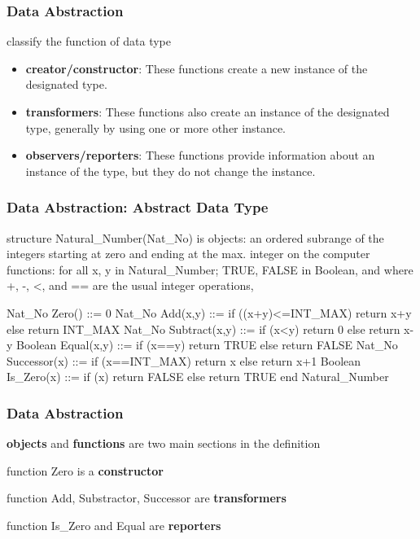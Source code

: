 \documentclass[newPxFont,sthlmFooter,nooffset]{beamer}
\begin{document}
\begin{frame}[t]
	\frametitle{Data Abstraction}
	classify the function of data type 
	\begin{itemize}
		\item\textbf{creator/constructor}: These functions create a new instance of the designated type.
		\item\textbf{transformers}: These functions also create an instance of the designated type, generally by using one or more other instance.
		\item\textbf{observers/reporters}: These functions provide information about an instance of the type, but they do not change the instance.
	\end{itemize}
	
\end{frame}

\begin{frame}[t, fragile]
  \frametitle{Data Abstraction: Abstract Data Type}
\begin{codedefnb}
structure Natural_Number(Nat_No) is
   objects: an ordered subrange of the integers 
            starting at zero and ending at the max. 
            integer on the computer 
   functions: for all x, y in Natural_Number; 
            TRUE, FALSE in Boolean, 
            and where +, -, <, and == are 
            the usual integer operations,

   Nat_No Zero() ::= 0
   Nat_No Add(x,y) ::= if ((x+y)<=INT_MAX) return x+y
      else return INT_MAX 
   Nat_No Subtract(x,y) ::= if (x<y) return 0
      else return x-y 
   Boolean Equal(x,y) ::= if (x==y) return TRUE
      else return FALSE 
   Nat_No Successor(x) ::= if (x==INT_MAX) return x
      else return x+1 
   Boolean Is_Zero(x) ::= if (x) return FALSE
      else return TRUE
end Natural_Number
\end{codedefnb}
\end{frame}

\begin{frame}[t]
  \frametitle{Data Abstraction}
\textbf{objects} and \textbf{functions} are two main sections in the definition

function Zero is a \textbf{constructor} 

function Add, Substractor, Successor are \textbf{transformers}

function Is\_Zero and Equal are \textbf{reporters}
\end{frame}
\end{document}
